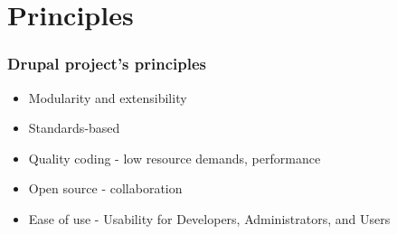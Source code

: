 \section{Principles}

\begin{frame}[allowframebreaks]
\frametitle{Drupal project's principles}

\begin{itemize}
	\item Modularity and extensibility
	\item Standards-based
	\item Quality coding \linebreak
	- low resource demands, performance
	\item Open source \linebreak
	- collaboration
	\item Ease of use \linebreak
	- Usability for Developers, Administrators, and Users
\end{itemize}

\end{frame}